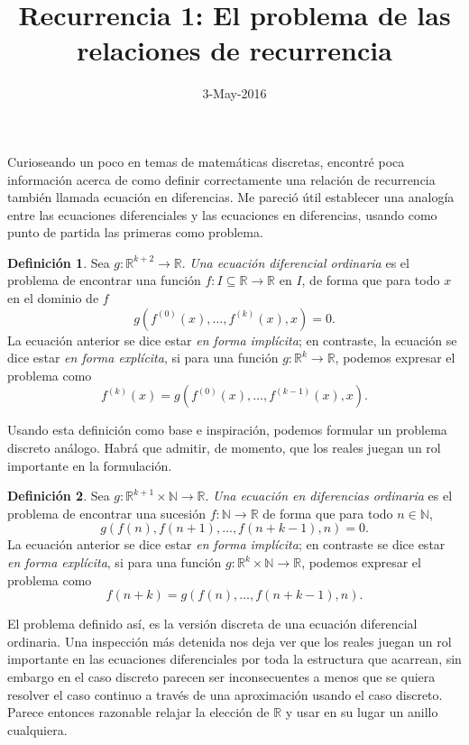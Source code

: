 \documentclass[letter,10pt,notitlepage]{amsart}
\title{Recurrencia 1: El problema de las relaciones de recurrencia}
\date{3-May-2016}
\theoremstyle{definition}
\newtheorem{definition}{Definición}
\theoremstyle{remark}
\begin{document}
\maketitle

Curioseando un poco en temas de matemáticas
discretas, encontré poca información acerca de
como definir correctamente una relación de recurrencia
también llamada ecuación en diferencias. Me pareció útil 
establecer una analogía entre las ecuaciones diferenciales
y las ecuaciones en diferencias, usando como punto de partida 
las primeras como  problema.

\begin{definition}
  Sea \( g \colon \mathbb{R}^{k+2} \to \mathbb{R}\). \emph{Una ecuación diferencial ordinaria}
  es el problema de encontrar una función \( f \colon I \subseteq \mathbb{R} \to \mathbb{R}\)
  en \( I\), de forma que para todo \( x\) en el dominio de \( f\)
  \[ g\left( f^{(0)}(x),\dots,f^{(k)}(x),x \right) = 0.\]
  La ecuación anterior se dice estar \emph{en forma implícita};
  en contraste, la ecuación se dice estar \emph{en forma explícita}, si para una función
  \( g \colon \mathbb{R}^k \to \mathbb{R}\), podemos expresar el problema
  como\[ f^{(k)}(x) = g\left( f^{(0)}(x),\dots,f^{(k-1)}(x),x \right).\]
\end{definition}

Usando esta definición como base e inspiración, podemos formular un problema
discreto análogo. Habrá que admitir, de momento, que los reales juegan un rol
importante en la formulación.

\begin{definition}
  Sea \( g \colon \mathbb{R}^{k+1} \times \mathbb{N} \to \mathbb{R}\).
  \emph{Una ecuación en diferencias ordinaria} es el problema de encontrar una
  sucesión \( f \colon \mathbb{N} \to \mathbb{R}\) de forma que
  para todo \( n \in \mathbb{N}\),
  \[ g(f(n), f(n+1), \dots, f(n+k-1),n) = 0.\]
  La ecuación anterior se dice estar \emph{en forma implícita}; en contraste
  se dice estar \emph{en forma explícita}, si para una función 
  \( g \colon \mathbb{R}^k \times \mathbb{N} \to \mathbb{R}\), 
  podemos expresar el problema como
  \[ f(n+k)=g( f(n), \dots, f(n+k-1),n).\]
\end{definition}

El problema definido así, es la versión discreta de una ecuación
diferencial ordinaria. Una inspección más detenida nos deja ver
que los reales juegan un rol importante en las ecuaciones diferenciales
por toda la estructura que acarrean, sin embargo en el caso discreto
parecen ser inconsecuentes a menos que se quiera resolver el caso
continuo a través de una aproximación usando el caso discreto.
Parece entonces razonable relajar la elección de \( \mathbb{R}\) y
usar en su lugar un anillo cualquiera.
\end{document}
